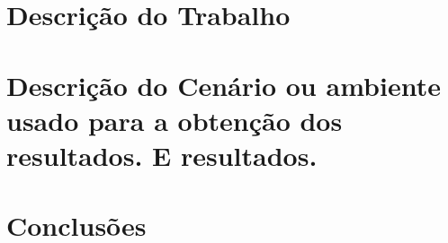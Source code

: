 \documentclass[a4paper]{book}
\begin{document}
\chapter{Descrição do Trabalho}

%

\chapter{Descrição do Cenário ou ambiente usado para a obtenção dos resultados. E resultados.}

%
%  

\chapter{Conclusões}

% 
\end{document}

